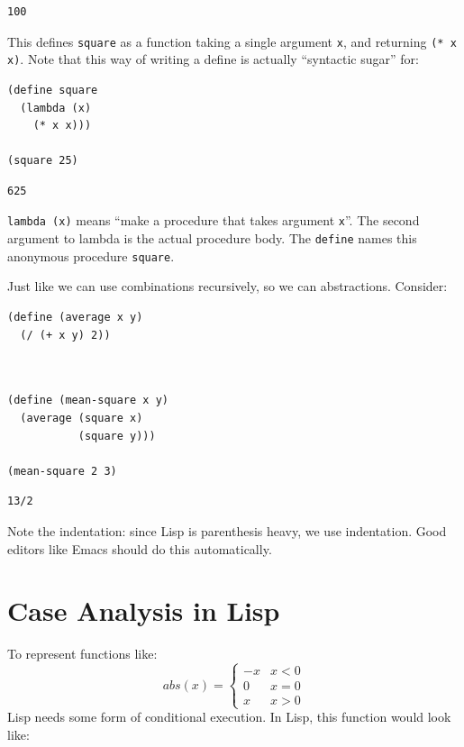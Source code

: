 \documentclass[9pt]{report}
\begin{document}
\begin{verbatim}
100
\end{verbatim}


This defines \texttt{square} as a function taking a single argument \texttt{x},
and returning \texttt{(* x x)}. Note that this way of writing a define is
actually ``syntactic sugar'' for:

\begin{verbatim}
(define square
  (lambda (x)
    (* x x)))

(square 25)
\end{verbatim}

\begin{verbatim}
625
\end{verbatim}


\texttt{lambda (x)} means ``make a procedure that takes argument \texttt{x}''. The
second argument to lambda is the actual procedure body. The
\texttt{define} names this anonymous procedure \texttt{square}.

Just like we can use combinations recursively, so we can
abstractions. Consider:

\begin{verbatim}
(define (average x y)
  (/ (+ x y) 2))
\end{verbatim}

\begin{verbatim}


(define (mean-square x y)
  (average (square x)
           (square y)))

(mean-square 2 3)
\end{verbatim}

\begin{verbatim}
13/2
\end{verbatim}


Note the indentation: since Lisp is parenthesis heavy, we use
indentation. Good editors like Emacs should do this automatically.

\section{Case Analysis in Lisp}
\label{sec:org62ef682}

To represent functions like:
$$abs(x) = \begin{cases}
   -x & x<0\\
   0 & x = 0\\
   x & x > 0
   \end{cases}$$
Lisp needs some form of conditional execution. In Lisp, this
function would look like:
\end{document}
